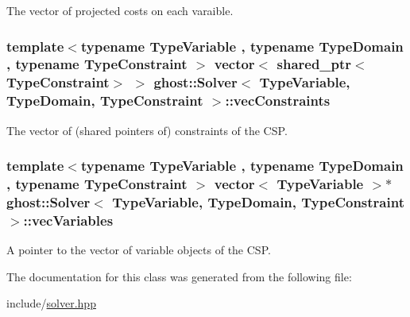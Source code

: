 The vector of projected costs on each varaible. 

\hypertarget{classghost_1_1Solver_a170746edcfb777b12978444c2ab3962e}{
\subsubsection[{vec\-Constraints}]{\setlength{\rightskip}{0pt plus 5cm}template$<$typename Type\-Variable , typename Type\-Domain , typename Type\-Constraint $>$ vector$<$ shared\-\_\-ptr$<$Type\-Constraint$>$ $>$ {\bf ghost\-::\-Solver}$<$ Type\-Variable, Type\-Domain, Type\-Constraint $>$\-::vec\-Constraints\hspace{0.3cm}{\ttfamily [private]}}}\label{classghost_1_1Solver_a170746edcfb777b12978444c2ab3962e}


The vector of (shared pointers of) constraints of the C\-S\-P. 

\hypertarget{classghost_1_1Solver_a2d033a454234b2277aabdcc4d89eaba2}{
\subsubsection[{vec\-Variables}]{\setlength{\rightskip}{0pt plus 5cm}template$<$typename Type\-Variable , typename Type\-Domain , typename Type\-Constraint $>$ vector$<$ Type\-Variable $>$$\ast$ {\bf ghost\-::\-Solver}$<$ Type\-Variable, Type\-Domain, Type\-Constraint $>$\-::vec\-Variables\hspace{0.3cm}{\ttfamily [private]}}}\label{classghost_1_1Solver_a2d033a454234b2277aabdcc4d89eaba2}


A pointer to the vector of variable objects of the C\-S\-P. 



The documentation for this class was generated from the following file\-:\begin{DoxyCompactItemize}
\item 
include/\hyperlink{solver_8hpp}{solver.\-hpp}\end{DoxyCompactItemize}
